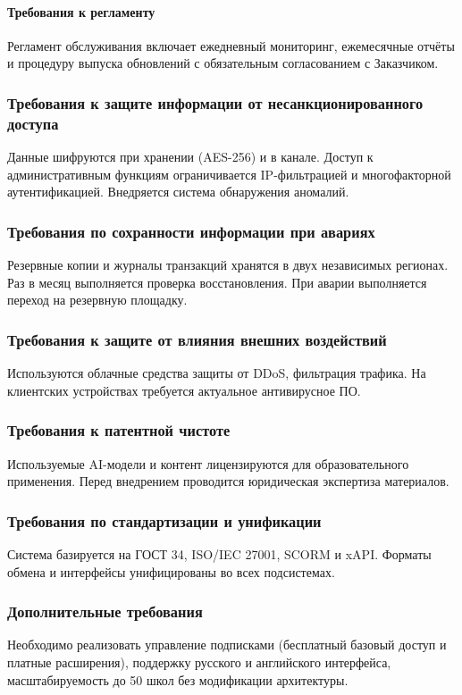 \documentclass[14pt,a4paper]{extarticle}
\begin{document}
\paragraph{Требования к регламенту} Регламент обслуживания включает ежедневный мониторинг, ежемесячные отчёты и процедуру выпуска обновлений с обязательным согласованием с Заказчиком.

\subsubsection{Требования к защите информации от несанкционированного доступа}
Данные шифруются при хранении (AES-256) и в канале. Доступ к административным функциям ограничивается IP-фильтрацией и многофакторной аутентификацией. Внедряется система обнаружения аномалий.

\subsubsection{Требования по сохранности информации при авариях}
Резервные копии и журналы транзакций хранятся в двух независимых регионах. Раз в месяц выполняется проверка восстановления. При аварии выполняется переход на резервную площадку.

\subsubsection{Требования к защите от влияния внешних воздействий}
Используются облачные средства защиты от DDoS, фильтрация трафика. На клиентских устройствах требуется актуальное антивирусное ПО.

\subsubsection{Требования к патентной чистоте}
Используемые AI-модели и контент лицензируются для образовательного применения. Перед внедрением проводится юридическая экспертиза материалов.

\subsubsection{Требования по стандартизации и унификации}
Система базируется на ГОСТ 34, ISO/IEC 27001, SCORM и xAPI. Форматы обмена и интерфейсы унифицированы во всех подсистемах.

\subsubsection{Дополнительные требования}
Необходимо реализовать управление подписками (бесплатный базовый доступ и платные расширения), поддержку русского и английского интерфейса, масштабируемость до 50 школ без модификации архитектуры.
\end{document}
